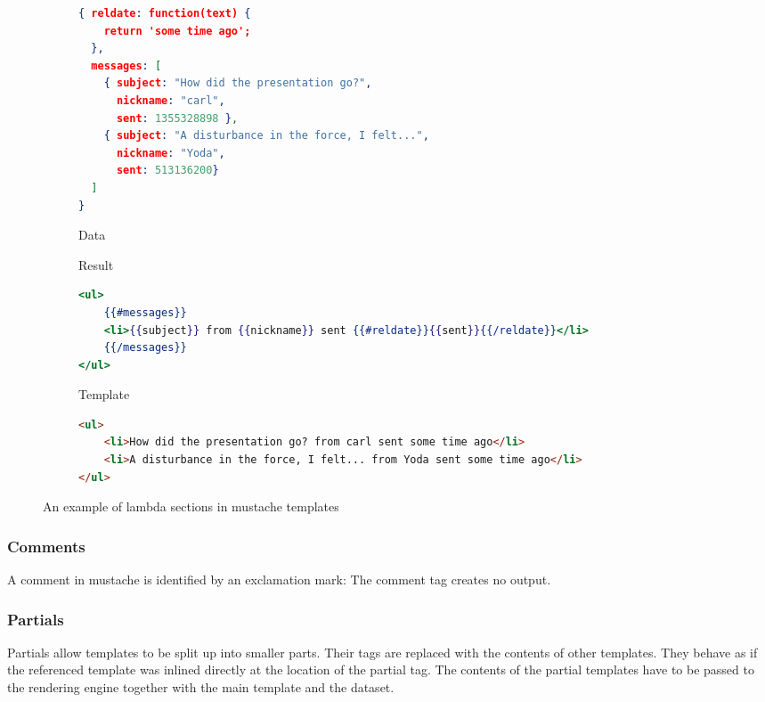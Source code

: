 \documentclass[thesis.tex]{subfiles}
\begin{document}
\begin{figure}
	\centering
	\begin{subfigure}{\textwidth}
		\caption{Data}
		\label{fig:lambda-example.data}
		\begin{lstlisting}[language=JSON]
{ reldate: function(text) {
  	return 'some time ago';
  },
  messages: [
  	{ subject: "How did the presentation go?",
  	  nickname: "carl",
  	  sent: 1355328898 },
  	{ subject: "A disturbance in the force, I felt...",
  	  nickname: "Yoda",
  	  sent: 513136200}
  ]
}
		\end{lstlisting}
	\end{subfigure}
	
	\begin{subfigure}{\textwidth}
		\caption{Result}
		\label{fig:lambda-example.html}
		\begin{lstlisting}[language=mustache]
<ul>
	{{#messages}}
	<li>{{subject}} from {{nickname}} sent {{#reldate}}{{sent}}{{/reldate}}</li>
	{{/messages}}
</ul>
		\end{lstlisting}
		\caption{Template}
		\label{fig:lambda-example.mustache}
	\end{subfigure}
	
	\begin{subfigure}{\textwidth}
		\begin{lstlisting}[language=HTML]
<ul>
	<li>How did the presentation go? from carl sent some time ago</li>
	<li>A disturbance in the force, I felt... from Yoda sent some time ago</li>
</ul>
		\end{lstlisting}
	\end{subfigure}
	\caption{An example of lambda sections in mustache templates}
	\label{fig:lambda-example}
\end{figure}

\subsubsection{Comments}
A comment in mustache is identified by an exclamation mark:
The comment tag creates no output.

\subsubsection{Partials}
Partials allow templates to be split up into smaller parts. Their tags are
replaced with the contents of other templates. They behave as if the referenced
template was inlined directly at the location of the partial tag.
The contents of the partial templates have to be passed to the rendering engine
together with the main template and the dataset.
\end{document}
